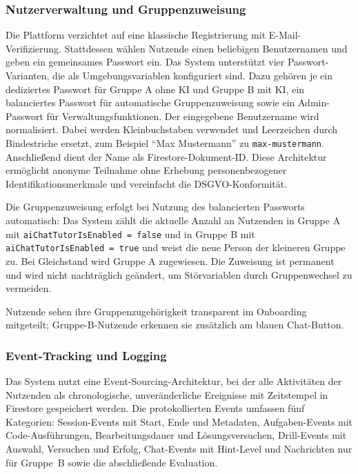 \subsubsection{Nutzerverwaltung und Gruppenzuweisung}

Die Plattform verzichtet auf eine klassische Registrierung mit E-Mail-Verifizierung.
Stattdessen wählen Nutzende einen beliebigen Benutzernamen und geben ein gemeinsames Passwort ein.
Das System unterstützt vier Passwort-Varianten, die als Umgebungsvariablen konfiguriert sind. Dazu gehören je ein dediziertes Passwort für Gruppe A ohne KI und Gruppe B mit KI, ein balanciertes Passwort für automatische Gruppenzuweisung sowie ein Admin-Passwort für Verwaltungsfunktionen.
Der eingegebene Benutzername wird normalisiert. Dabei werden Kleinbuchstaben verwendet und Leerzeichen durch Bindestriche ersetzt, zum Beispiel \enquote{Max Mustermann} zu \texttt{max-mustermann}. Anschließend dient der Name als Firestore-Dokument-ID.
Diese Architektur ermöglicht anonyme Teilnahme ohne Erhebung personenbezogener Identifikationsmerkmale und vereinfacht die DSGVO-Konformität.

Die Gruppenzuweisung erfolgt bei Nutzung des balancierten Passworts automatisch: Das System zählt die aktuelle Anzahl an Nutzenden in Gruppe A mit \texttt{aiChatTutorIsEnabled = false} und in Gruppe B mit \texttt{aiChatTutorIsEnabled = true} und weist die neue Person der kleineren Gruppe zu. Bei Gleichstand wird Gruppe A zugewiesen.
Die Zuweisung ist permanent und wird nicht nachträglich geändert, um Störvariablen durch Gruppenwechsel zu vermeiden.

Nutzende sehen ihre Gruppenzugehörigkeit transparent im Onboarding mitgeteilt; Gruppe-B-Nutzende erkennen sie zusätzlich am blauen Chat-Button.

\subsubsection{Event-Tracking und Logging}

Das System nutzt eine Event-Sourcing-Architektur, bei der alle Aktivitäten der Nutzenden als chronologische, unveränderliche Ereignisse mit Zeitstempel in Firestore gespeichert werden.
Die protokollierten Events umfassen fünf Kategorien: Session-Events mit Start, Ende und Metadaten, Aufgaben-Events mit Code-Ausführungen, Bearbeitungsdauer und Lösungsversuchen, Drill-Events mit Auswahl, Versuchen und Erfolg, Chat-Events mit Hint-Level und Nachrichten nur für Gruppe~B sowie die abschließende Evaluation.

